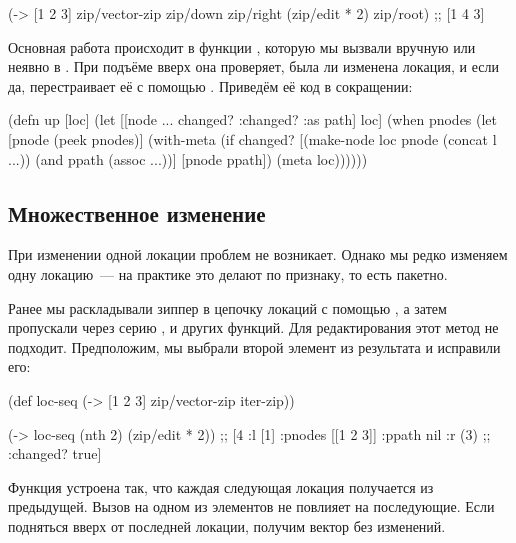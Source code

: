 \begin{english}
  \begin{clojure}
(-> [1 2 3]
    zip/vector-zip
    zip/down
    zip/right
    (zip/edit * 2)
    zip/root)
;; [1 4 3]
  \end{clojure}
\end{english}

Основная работа происходит в функции , которую мы вызвали вручную или
неявно в . При подъёме вверх она проверяет, была ли изменена локация,
и если да, перестраивает её с помощью . Приведём её код в сокращении:

\begin{english}
  \begin{clojure}
(defn up
  [loc]
  (let [[node {... changed? :changed? :as path}] loc]
    (when pnodes
      (let [pnode (peek pnodes)]
        (with-meta (if changed?
                     [(make-node loc pnode (concat l ...))
                      (and ppath (assoc ...))]
                     [pnode ppath])
                   (meta loc))))))
  \end{clojure}
\end{english}

\subsection{Множественное изменение}

При изменении одной локации проблем не возникает. Однако мы редко изменяем одну
локацию~--- на практике это делают по признаку, то есть пакетно.

Ранее мы раскладывали зиппер в цепочку локаций с помощью , а затем
пропускали через серию ,  и других функций. Для редактирования этот
метод не подходит. Предположим, мы выбрали второй элемент из результата
 и исправили его:

\begin{english}
  \begin{clojure}
(def loc-seq
  (-> [1 2 3]
      zip/vector-zip
      iter-zip))

(-> loc-seq (nth 2) (zip/edit * 2))
;; [4 {:l [1] :pnodes [[1 2 3]] :ppath nil :r (3)
;;    :changed? true}]
  \end{clojure}
\end{english}

Функция  устроена так, что каждая следующая локация получается из
предыдущей. Вызов  на одном из элементов не повлияет на
последующие. Если подняться вверх от последней локации, получим вектор без
изменений.

